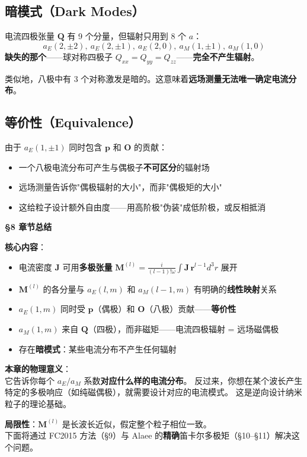 \subsection{暗模式（Dark Modes）}

\begin{nontrivial}
电流四极张量 $\mathbf{Q}$ 有 9 个分量，但辐射只用到 8 个 $a$：
$$
a_E(2,\pm2),\ a_E(2,\pm1),\ a_E(2,0),\ a_M(1,\pm1),\ a_M(1,0)
$$
\textbf{缺失的那个}——球对称四极子 $Q_{xx}=Q_{yy}=Q_{zz}$——\textbf{完全不产生辐射}。

类似地，八极中有 3 个对称激发是暗的。这意味着\textbf{远场测量无法唯一确定电流分布}。
\end{nontrivial}

\subsection{等价性（Equivalence）}

由于 $a_E(1,\pm1)$ 同时包含 $\mathbf{p}$ 和 $\mathbf{O}$ 的贡献：
\begin{itemize}
  \item 一个八极电流分布可产生与偶极子\textbf{不可区分}的辐射场
  \item 远场测量告诉你"偶极辐射的大小"，而非"偶极矩的大小"
  \item 这给粒子设计额外自由度——用高阶极"伪装"成低阶极，或反相抵消
\end{itemize}

\begin{chaptersummary}

\textbf{\S8 章节总结}

\textbf{核心内容}：
\begin{itemize}
  \item 电流密度 $\mathbf{J}$ 可用\textbf{多极张量} $\mathbf{M}^{(l)} = \frac{i}{(l-1)!\omega}\int\mathbf{J}\,\mathbf{r}^{l-1}d^3r$ 展开
  \item $\mathbf{M}^{(l)}$ 的各分量与 $a_E(l,m)$ 和 $a_M(l-1,m)$ 有明确的\textbf{线性映射}关系
  \item $a_E(1,m)$ 同时受 $\mathbf{p}$（偶极）和 $\mathbf{O}$（八极）贡献——\textbf{等价性}
  \item $a_M(1,m)$ 来自 $\mathbf{Q}$（四极），而非磁矩——电流四极辐射 = 远场磁偶极
  \item 存在\textbf{暗模式}：某些电流分布不产生任何辐射
\end{itemize}

\textbf{本章的物理意义}：\\
它告诉你每个 $a_E/a_M$ 系数\textbf{对应什么样的电流分布}。
反过来，你想在某个波长产生特定的多极响应（如纯磁偶极），就需要设计对应的电流模式。
这是逆向设计纳米粒子的理论基础。

\textbf{局限性}：$\mathbf{M}^{(l)}$ 是长波长近似，假定整个粒子相位一致。\\
下面将通过 FC2015 方法（\S9）与 Alaee 的\textbf{精确}笛卡尔多极矩（\S10--\S11）解决这个问题。

\end{chaptersummary}

\newpage

